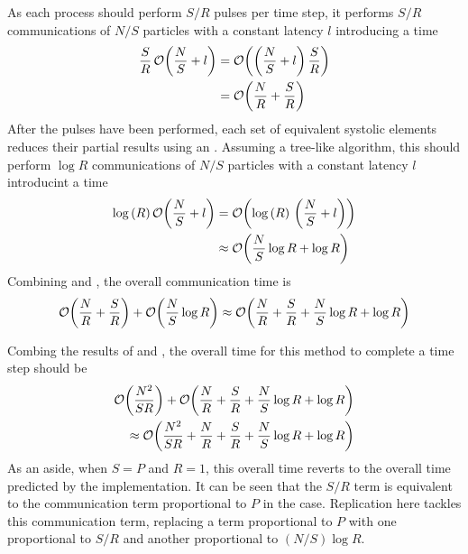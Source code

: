 %
As each process should perform $S/R$ pulses per time step, it performs
$S/R$ communications of $N/S$ particles with a constant latency $l$
introducing a time
\begin{equation}
    \label{eqn:replicated_systolic_pair_operation_pulse_time}
    \begin{split}
        \frac{S}{R}\,\mathcal{O}{\left({ \frac{N}{S} + l }\right)}
            &= \mathcal{O}{\left({ \left(\frac{N}{S} + l\right)\frac{S}{R} }\right)} \\
            &= \mathcal{O}{\left({ \frac{N}{R} + \frac{S}{R} }\right)}
    \end{split}
\end{equation}
%
After the pulses have been performed, each set of equivalent systolic
elements reduces their partial results using an \mpiallreduce{}.
%
Assuming a tree-like algorithm, this should perform $\log{R}$ communications
of $N/S$ particles with a constant latency $l$ introducint a time
\begin{equation}
    \label{eqn:replicated_systolic_pair_operation_reduce_time}
    \begin{split}
        \log{(R)}\,\mathcal{O}{\left({ \frac{N}{S} + l }\right)}
            &= \mathcal{O}{\left({ \log{(R)}\, \left(\frac{N}{S} + l\right) }\right)} \\
            &\approx{} \mathcal{O}{\left({ \frac{N}{S}\log{R} + \log{R} }\right)}
    \end{split}
\end{equation}
%
Combining
 and
,
the overall communication time is
\begin{equation}
    \label{eqn:replicated_systolic_pair_operation_communication_time}
    \mathcal{O}{\left({ \frac{N}{R} + \frac{S}{R} }\right)} + \mathcal{O}{\left({ \frac{N}{S}\log{R} }\right)}
        \approx{}
        \mathcal{O}{\left({ \frac{N}{R} + \frac{S}{R} + \frac{N}{S}\log{R} + \log{R} }\right)}
\end{equation}

%
Combing the results of 
 and
,
the overall time for this method to complete a time step should be
\begin{equation}
    \label{eqn:replicated_systolic_pair_operation_overall_time}
    \begin{split}
    \mathcal{O}{\left({ \frac{N^2}{SR} }\right)}
        + \mathcal{O}{\left({ \frac{N}{R} + \frac{S}{R} + \frac{N}{S}\log{R} + \log{R} }\right)} \\
        \approx{} \mathcal{O}{\left({ \frac{N^2}{SR}
        + \frac{N}{R} + \frac{S}{R} + \frac{N}{S}\log{R} + \log{R} }\right)}
    \end{split}
\end{equation}
%
As an aside, when $S = P$ and $R = 1$, this overall time reverts
to the overall time predicted by the \systolicloop{} implementation.
%
It can be seen that the $S/R$ term is equivalent to the communication
term proportional to $P$ in the \systolicloop{} case.
%
Replication here tackles this communication term, replacing a term
proportional to $P$ with one proportional to $S/R$ and another
proportional to $(N/S)\log{R}$.


